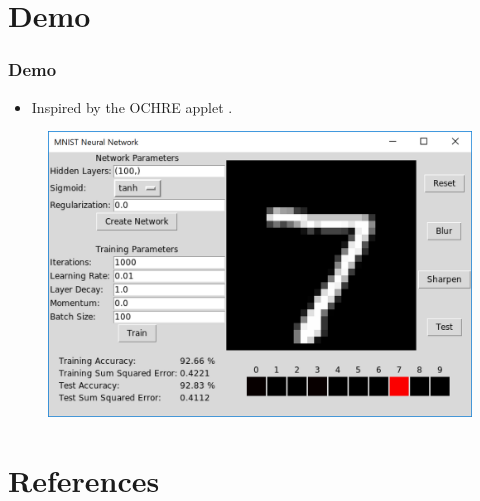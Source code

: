 \documentclass[pdf]{beamer}
\begin{document}
\section{Demo}

\begin{frame}
\frametitle{Demo}
\begin{itemize}
  \item Inspired by the OCHRE applet \cite{ochre}.
\end{itemize}
\begin{figure}[!htb]
  \includegraphics[height=0.6\textheight]{figures/gui.png}
\end{figure}
\end{frame}

\section{References}

\begin{frame}


\end{frame}
\end{document}
